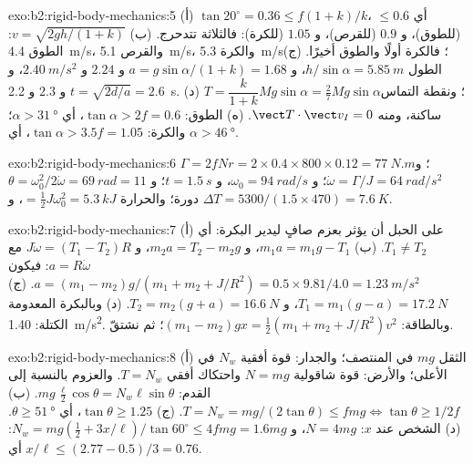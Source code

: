 \begin{solution}{exo:b2:rigid-body-mechanics:5}
(أ) $\tan20^\circ = 0.36 \le f(1 + k)/k$، أي $\le 0.6$ (للطوق)، و $0.9$
(للقرص)، و $1.05$ (للكرة): فالثلاثة تتدحرج. (ب) $v = \sqrt{2gh/(1 + k)}$:
الطوق \qty{4.4}{m/s}، والقرص \qty{5.1}{m/s}، والكرة \qty{5.3}{m/s}؛ فالكرة
أولًا والطوق أخيرًا. (ج) الطول $h/\sin\alpha = \qty{5.85}{m}$، و $a = g\sin\alpha/(1 + k) =
1.68$ و $2.24$ و $\qty{2.40}{m/s^2}$، و $t = \sqrt{2d/a} = 2.6$ و $2.3$ و \qty{2.2}{s}.
(د) $T = \dfrac{k}{1 + k}Mg\sin\alpha = \tfrac27Mg\sin\alpha$؛ ونقطة التماس
ساكنة، ومنه $\vect T\cdot\vect v_I = 0$. (ه) الطوق: $\tan\alpha >
2f = 0.6$، أي $\alpha > \qty{31}{\degree}$؛ والكرة: $\tan\alpha > 3.5f = 1.05$،
أي $\alpha > \qty{46}{\degree}$.
\end{solution}

\begin{solution}{exo:b2:rigid-body-mechanics:6}
$\Gamma = 2fNr = 2 \times 0.4 \times 800 \times 0.12 = \qty{77}{N.m}$؛ و $\dot\omega =
\Gamma/J = \qty{64}{rad/s^2}$؛ و $\omega_0 = \qty{94}{rad/s}$، و $t = \qty{1.5}{s}$؛
و $\theta = \omega_0^2/2\dot\omega = \qty{69}{rad} = 11$ دورة؛ والحرارة $= \tfrac12J
\omega_0^2 = \qty{5.3}{kJ}$، و $\Delta T = 5300/(1.5 \times 470) = \qty{7.6}{K}$.
\end{solution}

\begin{solution}{exo:b2:rigid-body-mechanics:7}
(أ) على الحبل أن يؤثر بعزم صافٍ ليدير البكرة: أي $T_1 \ne T_2$.
(ب) $m_1a = m_1g - T_1$، و $m_2a = T_2 - m_2g$، و $J\dot\omega = (T_1 - T_2)R$ مع
$a = R\dot\omega$: فيكون $a = (m_1 - m_2)g/(m_1 + m_2 + J/R^2) = 0.5 \times 9.81/4.0 =
\qty{1.23}{m/s^2}$. (ج) $T_1 = m_1(g - a) = \qty{17.2}{N}$، و $T_2 = m_2(g + a) =
\qty{16.6}{N}$. (د) وبالبكرة المعدومة الكتلة: \qty{1.40}{m/s^2}. وبالطاقة: $(m_1 - m_2)gx =
\tfrac12(m_1 + m_2 + J/R^2)v^2$؛ ثم نشتقّ.
\end{solution}

\begin{solution}{exo:b2:rigid-body-mechanics:8}
(أ) الثقل $mg$ في المنتصف؛ والجدار: قوة أفقية $N_w$ في الأعلى؛
والأرض: قوة شاقولية $N = mg$ واحتكاك أفقي $T = N_w$. والعزوم بالنسبة
إلى القدم: $mg\,\tfrac{\ell}2\cos\theta = N_w\ell\sin\theta$. (ب) $T = N_w =
mg/(2\tan\theta) \le fmg \iff \tan\theta \ge 1/2f$. (ج) $\tan\theta \ge
1.25$، أي $\theta \ge \qty{51}{\degree}$. (د) الشخص عند $x$: $N = 4mg$، و $N_w =
mg(\tfrac12 + 3x/\ell)/\tan60^\circ \le 4fmg = 1.6mg$: أي $x/\ell \le (2.77 -
0.5)/3 = 0.76$.
\end{solution}

